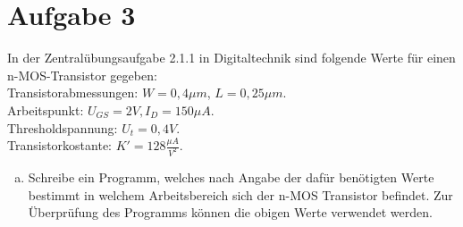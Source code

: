 \documentclass{standalone}
\begin{document}
\section{Aufgabe 3}
    In der Zentralübungsaufgabe 2.1.1 in Digitaltechnik sind folgende Werte für einen 
    n-MOS-Transistor gegeben: \\
    Transistorabmessungen: $W = 0,4\mu m$, $L = 0,25\mu m$.\\
    Arbeitspunkt: $U_{GS} = 2V, I_D = 150\mu A$.\\
    Thresholdspannung: $U_t = 0,4V$.\\
    Transistorkostante: $K' = 128 \frac{\mu A}{V^2}$.

\begin{enumerate}[a)]
\item
    Schreibe ein Programm, welches nach Angabe der dafür benötigten Werte bestimmt 
    in welchem Arbeitsbereich sich der n-MOS Transistor befindet. 
    Zur Überprüfung des Programms können die obigen Werte verwendet werden.

\end{enumerate}
\end{document}
